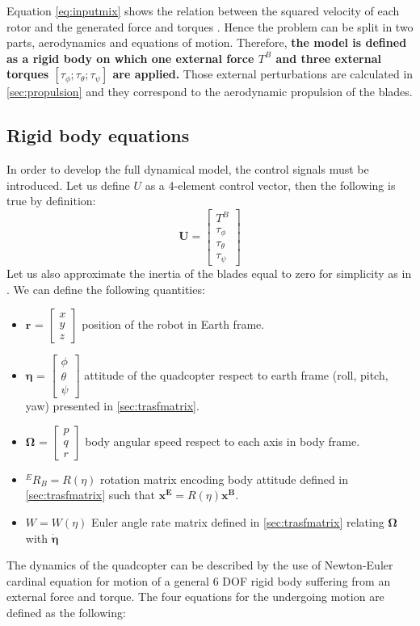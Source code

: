Equation \ref{eq:inputmix} shows the relation between the squared velocity of each rotor and the generated force and torques  . Hence the problem can be split in two parts, aerodynamics and equations of motion. Therefore, \textbf{the model is defined as a rigid body on which one external force $T^B$ and three external torques $[\tau_\phi ; \tau_\theta ; \tau_\psi]$ are applied.} Those external perturbations are calculated in \ref{sec:propulsion} and they correspond to the aerodynamic propulsion of the blades. 

\subsection{Rigid body equations}

In order to develop the full dynamical model, the control signals must be introduced. Let us define $U$ as a 4-element control vector, then the following is true by definition:
\begin{equation}
\textbf{U} = \begin{bmatrix}
T^B\\\tau_\phi \\ \tau_\theta \\ \tau_\psi
\end{bmatrix}
\label{eq:inputs}
\end{equation}
Let us also approximate the inertia of the blades equal to zero for simplicity as in \cite{Vendittelli}. We can define the following quantities:\begin{itemize}
\item $\boldsymbol{r}$ = $\begin{bmatrix} x\\y\\z\end{bmatrix}$ position of the robot in Earth frame.
\item $\boldsymbol{\eta}$ = $\begin{bmatrix} \phi\\\theta\\\psi\end{bmatrix}$ attitude of the quadcopter respect to earth frame (roll, pitch, yaw) presented in \ref{sec:trasfmatrix}.
\item $\boldsymbol{\Omega}$ = $\begin{bmatrix} p\\q\\r\end{bmatrix}$ body angular speed respect to each axis in body frame.
\item ${}^ER_B = R(\eta)$ rotation matrix encoding body attitude defined in \ref{sec:trasfmatrix} such that $\boldsymbol{x^E} =  R(\eta) \boldsymbol{x^B}$.

\item $W = W(\eta)$ Euler angle rate matrix defined in \ref{sec:trasfmatrix} relating $\boldsymbol{\Omega}$ with $\dot{\boldsymbol{\eta}}$ 
\end{itemize}
The dynamics of the quadcopter can be described by the use of Newton-Euler cardinal equation for motion of a general 6 DOF rigid body suffering from an external force and torque. The four equations for the undergoing motion are defined as the following:

